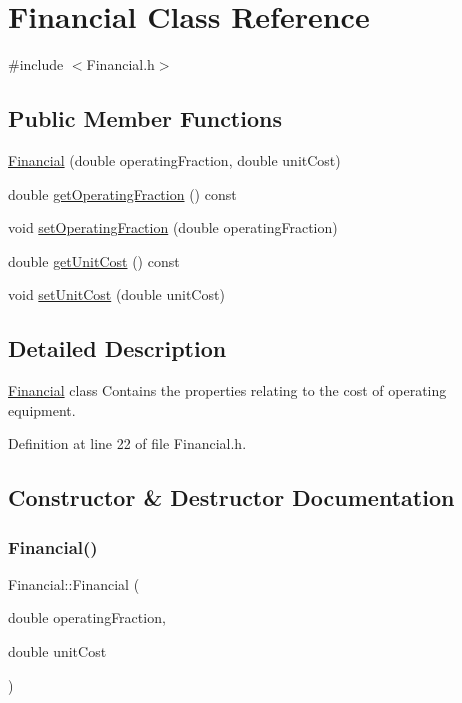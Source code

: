 \hypertarget{class_financial}{}\section{Financial Class Reference}
\label{class_financial}


{\ttfamily \#include $<$Financial.\+h$>$}

\subsection*{Public Member Functions}
\begin{DoxyCompactItemize}
\item 
\hyperlink{class_financial_abe8c4d82e9aede125e7e42ad3d53f90a}{Financial} (double operating\+Fraction, double unit\+Cost)
\item 
double \hyperlink{class_financial_a650ee2678b49d8d19b541f15d5a37c05}{get\+Operating\+Fraction} () const
\item 
void \hyperlink{class_financial_a966250111b2f7a00d797a9d153ee8a83}{set\+Operating\+Fraction} (double operating\+Fraction)
\item 
double \hyperlink{class_financial_adc3092e8f4cfd065042638236d21eaf4}{get\+Unit\+Cost} () const
\item 
void \hyperlink{class_financial_a84ead2ef72b2d348e05eb308d01e9265}{set\+Unit\+Cost} (double unit\+Cost)
\end{DoxyCompactItemize}


\subsection{Detailed Description}
\hyperlink{class_financial}{Financial} class Contains the properties relating to the cost of operating equipment. 

Definition at line 22 of file Financial.\+h.



\subsection{Constructor \& Destructor Documentation}
\mbox{\label{class_financial_abe8c4d82e9aede125e7e42ad3d53f90a}} 
\subsubsection{\texorpdfstring{Financial()}{Financial()}}
{\footnotesize\ttfamily Financial\+::\+Financial (\begin{DoxyParamCaption}\item[{double}]{operating\+Fraction,  }\item[{double}]{unit\+Cost }\end{DoxyParamCaption})\hspace{0.3cm}{\ttfamily [inline]}}

